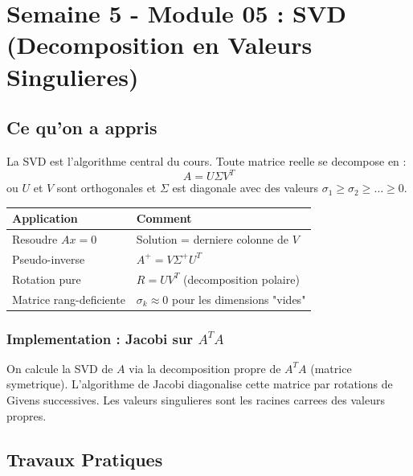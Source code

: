 \documentclass[12pt,a4paper]{report}
\begin{document}
\chapter{Semaine 5 - Module 05 : SVD (Decomposition en Valeurs Singulieres)}

\section{Ce qu'on a appris}

La SVD est l'algorithme central du cours. Toute matrice reelle se decompose en :
\[
A = U \Sigma V^T
\]
ou $U$ et $V$ sont orthogonales et $\Sigma$ est diagonale avec des valeurs $\sigma_1 \geq \sigma_2 \geq \ldots \geq 0$.

\begin{center}
\begin{tabular}{ll}
  \toprule
  \textbf{Application} & \textbf{Comment} \\
  \midrule
  Resoudre $Ax=0$ & Solution = derniere colonne de $V$ \\
  Pseudo-inverse & $A^+ = V\Sigma^+U^T$ \\
  Rotation pure & $R = UV^T$ (decomposition polaire) \\
  Matrice rang-deficiente & $\sigma_k \approx 0$ pour les dimensions "vides" \\
  \bottomrule
\end{tabular}
\end{center}

\subsection*{Implementation : Jacobi sur $A^T A$}

On calcule la SVD de $A$ via la decomposition propre de $A^TA$ (matrice symetrique). L'algorithme de Jacobi diagonalise cette matrice par rotations de Givens successives. Les valeurs singulieres sont les racines carrees des valeurs propres.

\section{Travaux Pratiques}
\end{document}
